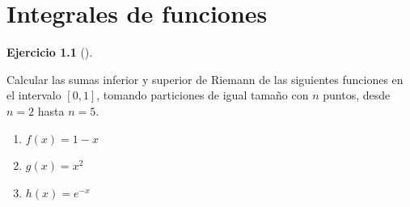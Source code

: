 \documentclass[
  a4paper,
]{scrreport}
\theoremstyle{definition}
\newtheorem{exercise}{Ejercicio}[chapter]
\theoremstyle{remark}
\begin{document}

\hypertarget{integrales-de-funciones}{%
\chapter{Integrales de funciones}\label{integrales-de-funciones}}

\leavevmode{}%
\begin{exercise}[]\label{exr-sumas-inferiores-superiores-riemann}

Calcular las sumas inferior y superior de Riemann de las siguientes
funciones en el intervalo \([0,1]\), tomando particiones de igual tamaño
con \(n\) puntos, desde \(n=2\) hasta \(n=5\).

\begin{enumerate}
\def\labelenumi{\alph{enumi}.}
\item
  \(f(x) = 1-x\)
\item
  \(g(x) = x^2\)
\item
  \(h(x) = e^{-x}\)
\end{enumerate}

\end{exercise}
\end{document}
